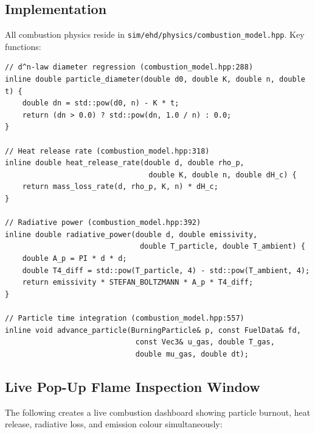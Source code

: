 \documentclass[11pt,a4paper]{article}
\begin{document}
\subsection{Implementation}

All combustion physics reside in \texttt{sim/ehd/physics/combustion\_model.hpp}.
Key functions:

\begin{lstlisting}[style=cpp,title={\textbf{C++ --- Combustion model core functions}}]
// d^n-law diameter regression (combustion_model.hpp:288)
inline double particle_diameter(double d0, double K, double n, double t) {
    double dn = std::pow(d0, n) - K * t;
    return (dn > 0.0) ? std::pow(dn, 1.0 / n) : 0.0;
}

// Heat release rate (combustion_model.hpp:318)
inline double heat_release_rate(double d, double rho_p,
                                 double K, double n, double dH_c) {
    return mass_loss_rate(d, rho_p, K, n) * dH_c;
}

// Radiative power (combustion_model.hpp:392)
inline double radiative_power(double d, double emissivity,
                               double T_particle, double T_ambient) {
    double A_p = PI * d * d;
    double T4_diff = std::pow(T_particle, 4) - std::pow(T_ambient, 4);
    return emissivity * STEFAN_BOLTZMANN * A_p * T4_diff;
}

// Particle time integration (combustion_model.hpp:557)
inline void advance_particle(BurningParticle& p, const FuelData& fd,
                              const Vec3& u_gas, double T_gas,
                              double mu_gas, double dt);
\end{lstlisting}

\subsection{Live Pop-Up Flame Inspection Window}

The following creates a live combustion dashboard showing particle burnout,
heat release, radiative loss, and emission colour simultaneously:
\end{document}
